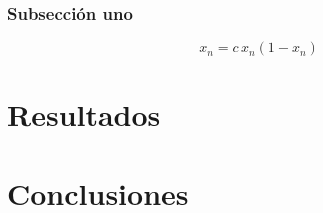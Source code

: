 \documentclass[letterpaper,12pt,oneside]{book}
\begin{document}
    \subsection{Subsecci\'on uno}
    \begin{equation}
    	x_n = c \, x_n(1 - x_n)
    	\label{Ec:logis}
    \end{equation}

\chapter{Resultados}  %

\chapter{Conclusiones}  %

%


\backmatter%
\end{document}
